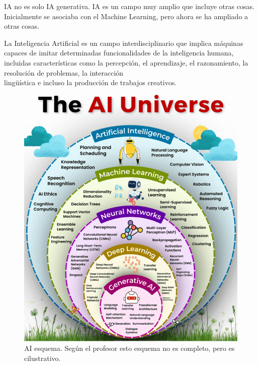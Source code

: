 \begin{paracol}{2}
   \colfill
   IA no es solo IA generativa. IA es un campo muy amplio que incluye otras cosas. Inicialmente se asociaba con el Machine Learning, pero ahora se ha ampliado a otras cosas.
   
   La Inteligencia Artificial es un campo interdisciplinario que implica máquinas capaces de imitar determinadas funcionalidades de la inteligencia humana, incluidas características como la percepción, el aprendizaje, el razonamiento, la resolución de problemas, la interacción\\lingüística e incluso la producción de trabajos creativos.
   \colfill

   \switchcolumn
   
   \begin{figure}[htbp]
      \centering
      \includegraphics[width=\columnwidth]{images/01/AI.png}
      \caption{AI esquema. Según el profesor esto esquema no es completo, pero es cilustrativo.}
      \label{fig:01/AI}
   \end{figure}
\end{paracol}



